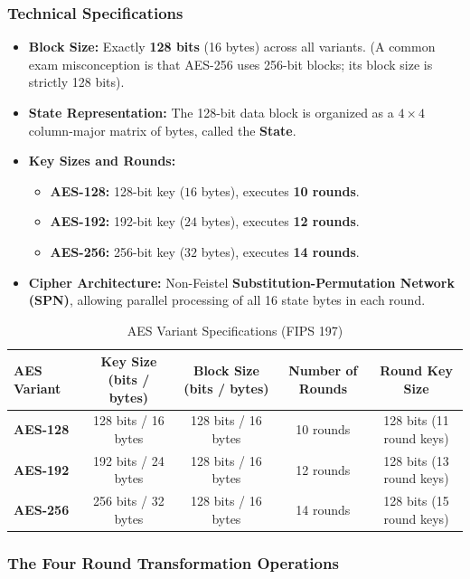 \subsubsection{Technical Specifications}

\begin{itemize}
\item \textbf{Block Size:} Exactly \textbf{128 bits} (16 bytes) across all variants. (A common exam misconception is that AES-256 uses 256-bit blocks; its block size is strictly 128 bits).
\item \textbf{State Representation:} The 128-bit data block is organized as a $4 \times 4$ column-major matrix of bytes, called the \textbf{State}.
\item \textbf{Key Sizes and Rounds:}
\begin{itemize}
\item \textbf{AES-128:} 128-bit key ($16$ bytes), executes \textbf{10 rounds}.
\item \textbf{AES-192:} 192-bit key ($24$ bytes), executes \textbf{12 rounds}.
\item \textbf{AES-256:} 256-bit key ($32$ bytes), executes \textbf{14 rounds}.
\end{itemize}
\item \textbf{Cipher Architecture:} Non-Feistel \textbf{Substitution-Permutation Network (SPN)}, allowing parallel processing of all 16 state bytes in each round.
\end{itemize}

\begin{table}[htbp]
\centering
\caption{AES Variant Specifications (FIPS 197)}
\label{tab:aes_specs}
\begin{tabularx}{\textwidth}{l c c c c}
\toprule
\textbf{AES Variant} & \textbf{Key Size (bits / bytes)} & \textbf{Block Size (bits / bytes)} & \textbf{Number of Rounds} & \textbf{Round Key Size} \\
\midrule
\textbf{AES-128} & 128 bits / 16 bytes & 128 bits / 16 bytes & 10 rounds & 128 bits (11 round keys) \\
\textbf{AES-192} & 192 bits / 24 bytes & 128 bits / 16 bytes & 12 rounds & 128 bits (13 round keys) \\
\textbf{AES-256} & 256 bits / 32 bytes & 128 bits / 16 bytes & 14 rounds & 128 bits (15 round keys) \\
\bottomrule
\end{tabularx}
\end{table}

\subsubsection{The Four Round Transformation Operations}

